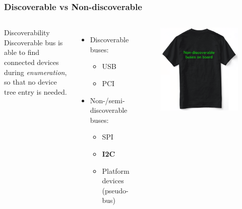 \begin{frame}
  \frametitle{Discoverable vs Non-discoverable}
  \begin{columns}
      \begin{block}{Discoverability}
      \alert{Discoverable bus} is able to find connected devices during
      \textit{enumeration}, so that no device tree entry is needed.
      \end{block}
      \begin{itemize}
        \item Discoverable buses:
          \begin{itemize}
            \item USB
            \item PCI
          \end{itemize}
        \item Non-/semi-discoverable buses:
          \begin{itemize}
            \item SPI
            \item \textbf{I2C}
            \item Platform devices (pseudo-bus)
          \end{itemize}
      \end{itemize}
      \begin{figure}
        \centering
        \includegraphics[scale=0.25]{images/t-shirt.png}
      \end{figure}
      \vspace*{-6mm}
  \end{columns}
\end{frame}

